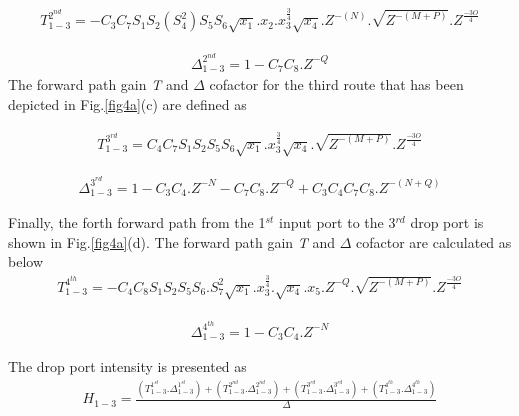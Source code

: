 \documentclass{osa-article}
\begin{document}
\begin{equation}
\begin{split}
T^{2^{nd}}_{1-3}=-C_3C_7S_1S_2(S^2_4)S_5S_6\sqrt{x_1}.x_{2}.{x^{\frac{3}{4}}_3}\sqrt{x_4}.Z^{-(N)}.\sqrt{Z^{-(M+P)}}.Z^{\frac{-3O}{4}}
\end{split}
\end{equation}

\begin{equation}
\begin{split}
\Delta^{2^{nd}}_{1-3}=1-C_7C_8.Z^{-Q}
\end{split}
\end{equation}
The forward path gain \textit {T} and $\Delta$ cofactor for the third route that has been depicted in Fig.\ref{fig4a}(c) are defined as

\begin{equation}
\begin{split}
T^{3^{rd}}_{1-3}=C_4C_7S_1S_2S_5S_6\sqrt{x_1}.{x^{\frac{3}{4}}_3}\sqrt{x_4}.\sqrt{Z^{-(M+P)}}.Z^{\frac{-3O}{4}}
\end{split}
\end{equation}

\begin{equation}
\begin{split}
\Delta^{3^{rd}}_{1-3}=1-C_3C_4.Z^{-N}-C_7C_8.Z^{-Q}+C_3C_4C_7C_8.Z^{-(N+Q)}
\end{split}
\end{equation}

Finally, the forth forward path from the 1$^{st}$ input port to the 3$^{rd}$ drop port is shown in Fig.\ref{fig4a}(d). The forward path gain \textit {T} and $\Delta$ cofactor are calculated as below
\begin{equation}
\begin{split}
T^{4^{th}}_{1-3}=-C_4C_8S_1S_2S_5S_6.S^2_7\sqrt{x_1}.{x^{\frac{3}{4}}_3}.\sqrt{x_4}.x_5.Z^{-Q}.\sqrt{Z^{-(M+P)}}.Z^{\frac{-3O}{4}}
\end{split}
\end{equation}

\begin{equation}
\begin{split}
\Delta^{4^{th}}_{1-3}=1-C_3C_4.Z^{-N}
\end{split}
\end{equation}

The drop port intensity is presented as
\begin{equation}
\begin{split}
H_{1-3}=\frac{(T^{1^{st}}_{1-3}.\Delta^{1^{st}}_{1-3})+(T^{2^{nd}}_{1-3}.\Delta^{2^{nd}}_{1-3})+(T^{3^{rd}}_{1-3}.\Delta^{3^{rd}}_{1-3})+(T^{4^{th}}_{1-3}.\Delta^{4^{th}}_{1-3})}{\Delta}
\end{split}
\end{equation}
\end{document}
